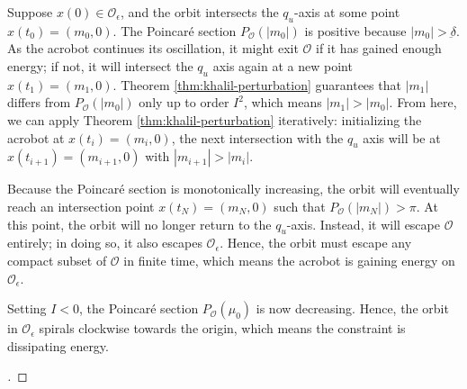 Suppose \(x(0) \in \mathcal{O}_\epsilon\), and the orbit
intersects the \(q_u\)-axis at some point \(x(t_0) = (m_0, 0)\).
The Poincar\'{e} section \(P_\mathcal{O}(|m_0|)\) is positive because 
\(|m_0| > \underbar{\delta}\).
As the acrobot continues its oscillation, it might exit
\(\mathcal{O}\) if it has gained enough energy;
if not, it will intersect the \(q_u\) axis again at
a new point \(x(t_1) = (m_1,0)\).
Theorem \ref{thm:khalil-perturbation} guarantees that \(|m_1|\) differs
from \(P_\mathcal{O}(|m_0|)\) only up to order \(I^2\), 
which means \(|m_1| > |m_0|\).
From here, we can apply Theorem \ref{thm:khalil-perturbation} iteratively:
initializing the acrobot at \(x(t_i) = (m_i, 0)\), the
next intersection with the \(q_u\) axis will be at
\(x(t_{i+1}) = (m_{i+1},0)\) with \(|m_{i+1}| > |m_i|\).

Because the Poincar\'{e} section is monotonically increasing, 
the orbit will eventually reach an intersection point \(x(t_N) = (m_N,0)\)
such that \(P_\mathcal{O}(|m_N|) > \pi\). 
At this point, the orbit will no longer return to the
\(q_u\)-axis.
Instead, it will escape \(\mathcal{O}\) entirely; 
in doing so, it also escapes \(\mathcal{O}_\epsilon\).
Hence, the orbit must escape any compact subset of \(\mathcal{O}\) in finite
time, which means the acrobot is gaining energy on \(\mathcal{O}_\epsilon\).

Setting \(I < 0\), the Poincar\'{e} section \(P_\mathcal{O}(\mu_0)\) is now
decreasing.
Hence, the orbit in \(\mathcal{O}_\epsilon\) spirals clockwise towards the origin, 
which means the constraint is dissipating energy.

\begin{proof}[\unskip\nopunct]
\end{proof}

